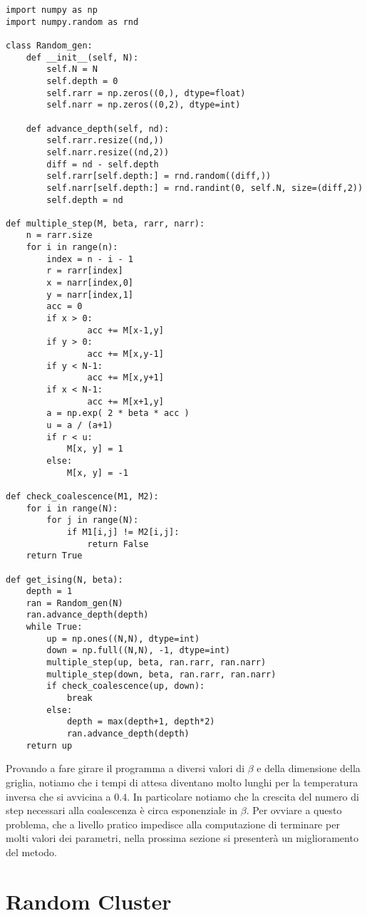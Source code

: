 \documentclass[]{marticle}
\begin{document}
\begin{lstlisting}
import numpy as np
import numpy.random as rnd

class Random_gen:
    def __init__(self, N):
        self.N = N
        self.depth = 0
        self.rarr = np.zeros((0,), dtype=float)
        self.narr = np.zeros((0,2), dtype=int)

    def advance_depth(self, nd):
        self.rarr.resize((nd,))
        self.narr.resize((nd,2))
        diff = nd - self.depth
        self.rarr[self.depth:] = rnd.random((diff,))
        self.narr[self.depth:] = rnd.randint(0, self.N, size=(diff,2))
        self.depth = nd

def multiple_step(M, beta, rarr, narr):
    n = rarr.size
    for i in range(n):
        index = n - i - 1
        r = rarr[index]
        x = narr[index,0]
        y = narr[index,1]
        acc = 0
        if x > 0:
                acc += M[x-1,y]
        if y > 0:
                acc += M[x,y-1]
        if y < N-1:
                acc += M[x,y+1]
        if x < N-1:
                acc += M[x+1,y]
        a = np.exp( 2 * beta * acc )
        u = a / (a+1)
        if r < u:
            M[x, y] = 1
        else:
            M[x, y] = -1

def check_coalescence(M1, M2):
    for i in range(N):
        for j in range(N):
            if M1[i,j] != M2[i,j]:
                return False
    return True

def get_ising(N, beta):
    depth = 1
    ran = Random_gen(N)
    ran.advance_depth(depth)
    while True:
        up = np.ones((N,N), dtype=int)
        down = np.full((N,N), -1, dtype=int)
        multiple_step(up, beta, ran.rarr, ran.narr)
        multiple_step(down, beta, ran.rarr, ran.narr)
        if check_coalescence(up, down):
            break
        else:
            depth = max(depth+1, depth*2)
            ran.advance_depth(depth)
    return up
\end{lstlisting}

Provando a fare girare il programma a diversi valori di $\beta$ e della
dimensione della griglia, notiamo che i tempi di attesa diventano molto lunghi
per la temperatura inversa che si avvicina a $0.4$. In particolare notiamo che
la crescita del numero di step necessari alla coalescenza \`e circa esponenziale
in $\beta$. Per ovviare a questo problema, che a livello pratico impedisce alla
computazione di terminare per molti valori dei parametri, nella prossima sezione
si presenter\`a un miglioramento del metodo.

\section{Random Cluster}
\end{document}
